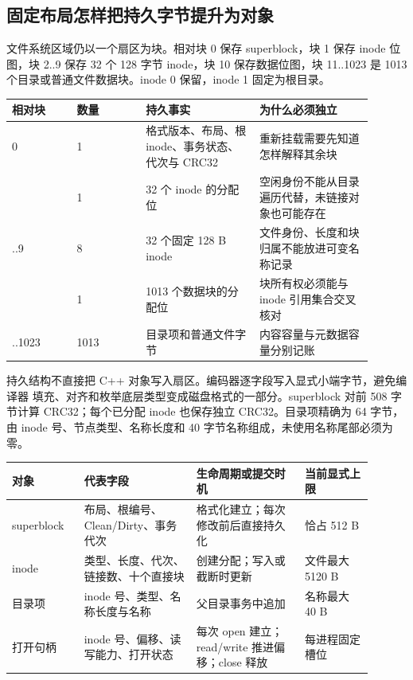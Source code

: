 \subsection{固定布局怎样把持久字节提升为对象}

文件系统区域仍以一个扇区为块。相对块 0 保存 superblock，块 1 保存 inode
位图，块 2..9 保存 32 个 128 字节 inode，块 10 保存数据位图，块 11..1023
是 1013 个目录或普通文件数据块。inode 0 保留，inode 1 固定为根目录。

\begin{longtable}{|L{0.16\linewidth}|L{0.17\linewidth}|L{0.28\linewidth}|L{0.29\linewidth}|}
\toprule
相对块 & 数量 & 持久事实 & 为什么必须独立 \\
 & 1 & 格式版本、布局、根 inode、事务状态、代次与 CRC32 & 重新挂载需要先知道怎样解释其余块 \\ & 1 & 32 个 inode 的分配位 & 空闲身份不能从目录遍历代替，未链接对象也可能存在 \\..9 & 8 & 32 个固定 128 B inode & 文件身份、长度和块归属不能放进可变名称记录 \\ & 1 & 1013 个数据块的分配位 & 块所有权必须能与 inode 引用集合交叉核对 \\..1023 & 1013 & 目录项和普通文件字节 & 内容容量与元数据容量分别记账 \\
\bottomrule
\end{longtable}

持久结构不直接把 C++ 对象写入扇区。编码器逐字段写入显式小端字节，避免编译器
填充、对齐和枚举底层类型变成磁盘格式的一部分。superblock 对前 508 字节计算
CRC32；每个已分配 inode 也保存独立 CRC32。目录项精确为 64 字节，由 inode
号、节点类型、名称长度和 40 字节名称组成，未使用名称尾部必须为零。

\begin{longtable}{|L{0.18\linewidth}|L{0.28\linewidth}|L{0.27\linewidth}|L{0.17\linewidth}|}
\toprule
对象 & 代表字段 & 生命周期或提交时机 & 当前显式上限 \\
\midrule
superblock & 布局、根编号、Clean/Dirty、事务代次 & 格式化建立；每次修改前后直接持久化 & 恰占 512 B \\\tablerowrule
inode & 类型、长度、代次、链接数、十个直接块 & 创建分配；写入或截断时更新 & 文件最大 5120 B \\\tablerowrule
目录项 & inode 号、类型、名称长度与名称 & 父目录事务中追加 & 名称最大 40 B \\\tablerowrule
打开句柄 & inode 号、偏移、读写能力、打开状态 & 每次 open 建立；read/write 推进偏移；close 释放 & 每进程固定槽位 \\
\bottomrule
\end{longtable}

